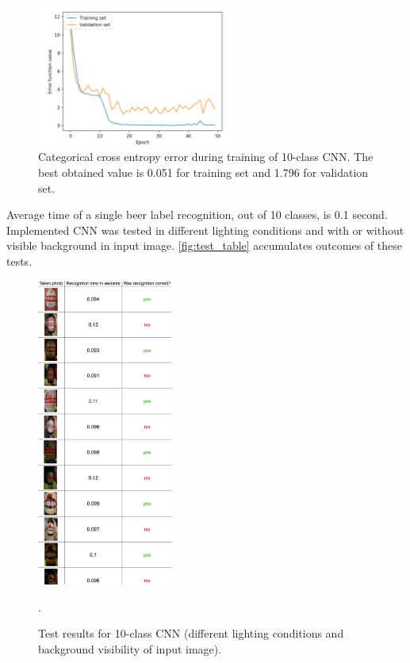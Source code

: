\documentclass[11pt, a4paper]{article}
\begin{document}
\begin{figure}[h]
\includegraphics[width=0.6\textwidth]{10_class_err}
\centering
\caption[Funkcja błędu rozpoznawarki 10 różnych etykiet piw]{Categorical cross entropy error during training of 10-class CNN. The best obtained value is 0.051 for training set and 1.796 for validation set.}
\label{fig:10_class_err}
\end{figure}

Average time of a single beer label recognition, out of 10 classes, is 0.1 second. Implemented CNN was tested in different lighting conditions and with or without visible background in input image. \autoref{fig:test_table} accumulates outcomes of these tests.\\

\begin{figure}[H]
\includegraphics[width=0.4\textwidth]{test_table}
\centering
\caption[Wyniki testowania rozpoznawarki 10 różnych etykiet piw]{Test results for 10-class CNN (different lighting conditions and background visibility of input image).}.
\label{fig:test_table}
\end{figure}
\end{document}
